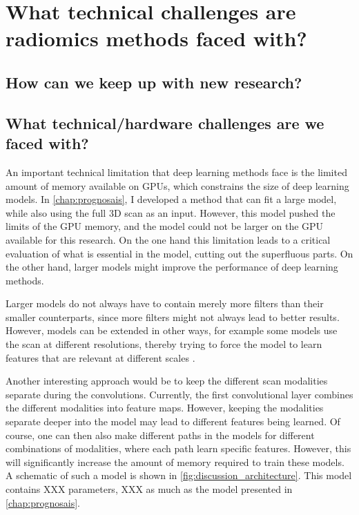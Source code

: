 \section{What technical challenges are radiomics methods faced with?}\label{sec:discussion_technical}
\subsection{How can we keep up with new research?}

\subsection{What technical/hardware challenges are we faced with?}

An important technical limitation that deep learning methods face is the limited amount of memory available on GPUs, which constrains the size of deep learning models.
In \cref{chap:prognosais}, I developed a method that can fit a large model, while also using the full 3D scan as an input.
However, this model pushed the limits of the GPU memory, and the model could not be larger on the GPU available for this research.
On the one hand this limitation leads to a critical evaluation of what is essential in the model, cutting out the superfluous parts.
On the other hand, larger models might improve the performance of deep learning methods.

Larger models do not always have to contain merely more filters than their smaller counterparts, since more filters might not always lead to better results.
However, models can be extended in other ways, for example some models use the scan at different resolutions, thereby trying to force the model to learn features that are relevant at different scales \autocite{akkus20171p19q}.

Another interesting approach would be to keep the different scan modalities separate during the convolutions.
Currently, the first convolutional layer combines the different modalities into feature maps.
However, keeping the modalities separate deeper into the model may lead to different features being learned.
Of course, one can then also make different paths in the models for different combinations of modalities, where each path learn specific features.
However, this will significantly increase the amount of memory required to train these models.
A schematic of such a model is shown in \cref{fig:discussion_architecture}.
This model contains XXX parameters, XXX as much as the model presented in \cref{chap:prognosais}.

